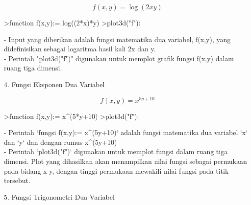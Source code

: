 \documentclass[a4paper,10pt]{article}
\begin{document}
\begin{eulernotebook}
\begin{eulercomment}
\begin{eulercomment}
\begin{eulercomment}
\begin{eulercomment}
\begin{eulercomment}
\begin{eulercomment}
\begin{eulercomment}
\begin{eulercomment}
\begin{eulercomment}
\end{eulercomment}
\begin{eulerformula}
\[
f(x,y)= \log(2xy)
\]
\end{eulerformula}
\begin{eulerprompt}
>function f(x,y):= log((2*x)*y)
>plot3d("f"):
\end{eulerprompt}
\begin{eulercomment}
- Input yang diberikan adalah fungsi matematika dua variabel, f(x,y),
yang didefinisikan sebagai logaritma hasil kali 2x dan y.\\
- Perintah "plot3d("f")" digunakan untuk memplot grafik fungsi f(x,y)
dalam ruang tiga dimensi.

\end{eulercomment}
\eulersubheading{}
\begin{eulercomment}
4. Fungsi Eksponen Dua Variabel

\end{eulercomment}
\begin{eulerformula}
\[
f(x,y)=x^{5y+10}
\]
\end{eulerformula}
\begin{eulerprompt}
>function f(x,y):= x^(5*y+10)
>plot3d("f"):
\end{eulerprompt}
\begin{eulercomment}
- Perintah `fungsi f(x,y):= x\textasciicircum{}(5y+10)` adalah fungsi matematika dua
variabel `x` dan `y` dan dengan rumus x\textasciicircum{}(5y+10)\\
- Perintah `plot3d("f")` digunakan untuk memplot fungsi dalam ruang
tiga dimensi. Plot yang dihasilkan akan menampilkan nilai fungsi
sebagai permukaan pada bidang x-y, dengan tinggi permukaan mewakili
nilai fungsi pada titik tersebut.

\end{eulercomment}
\eulersubheading{}
\begin{eulercomment}
5. Fungsi Trigonometri Dua Variabel


\end{eulercomment}
\end{eulercomment}
\end{eulercomment}
\end{eulercomment}
\end{eulercomment}
\end{eulercomment}
\end{eulercomment}
\end{eulercomment}
\end{eulercomment}
\end{eulernotebook}
\end{document}
